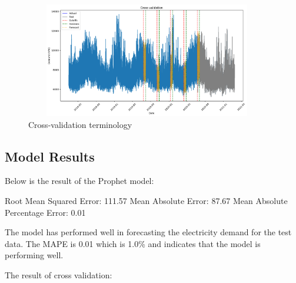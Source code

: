 \documentclass[mstat,12pt]{unswthesis}
\newenvironment{Shaded}{\begin{snugshade}}{\end{snugshade}}
\newcommand{\FloatTok}[1]{\textcolor[rgb]{0.00,0.00,0.81}{#1}}
\newcommand{\NormalTok}[1]{#1}
\begin{document}
\begin{figure}[H]
\centering
\includegraphics[width=0.95\textwidth, height=5cm]{cutoff_crossvalidation.png}
\caption{Cross-validation terminology}\label{cross_validation_output}
\end{figure}

\subsection{Model Results}\label{model-results}

Below is the result of the Prophet model:

\begin{Shaded}
\begin{Highlighting}[]
\NormalTok{Root Mean Squared Error: }\FloatTok{111.57}
\NormalTok{Mean Absolute Error: }\FloatTok{87.67}
\NormalTok{Mean Absolute Percentage Error: }\FloatTok{0.01}
\end{Highlighting}
\end{Shaded}

The model has performed well in forecasting the electricity demand for
the test data. The MAPE is 0.01 which is 1.0\% and indicates that the
model is performing well.

The result of cross validation:
\end{document}
